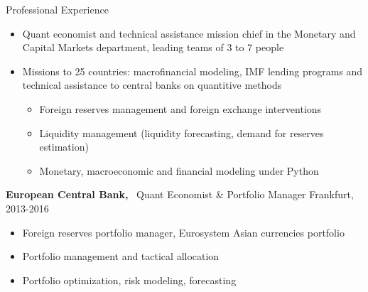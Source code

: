 \documentclass[usegeometry, 10pt, a4paper]{cv} %
\newcommand{\activite}[1]{\textbf{#1}\ }
\begin{document}
\begin{rubriquetableau}[0.95\textwidth]{Professional Experience}
\begin{itemize}[label={}, rightmargin=\dimexpr\linewidth-13cm-\leftmargin\relax]
\item Quant economist and technical assistance mission chief in the Monetary and Capital Markets department, leading teams of 3 to 7 people
\item Missions to 25 countries: macrofinancial  modeling, IMF lending programs and technical assistance to central banks on quantitive methods
  \begin{itemize}
  \item Foreign reserves management and foreign exchange interventions
  \item Liquidity management (liquidity forecasting, demand for reserves estimation)
  \item Monetary, macroeconomic and financial modeling under Python
  \end{itemize}
 \end{itemize}
 
\vspace{0.2cm}

\activite{European Central Bank,} Quant Economist \& Portfolio Manager \hfill Frankfurt, 2013-2016 \\
\vspace{-0.2cm}

\begin{itemize}[label={}, rightmargin=\dimexpr\linewidth-13cm-\leftmargin\relax]
\item Foreign reserves portfolio manager, Eurosystem Asian currencies portfolio 
\item Portfolio management and tactical allocation
\item Portfolio optimization, risk modeling, forecasting  
\end{itemize}
\end{rubriquetableau}


\newpage
\end{document}
